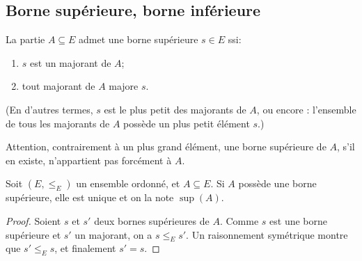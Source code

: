 \subsection{Borne supérieure, borne inférieure}

\begin{definition}
 La partie $A\subseteq E$ admet une borne supérieure $s\in E$ ssi:
\begin{enumerate}
\item $s$ est un majorant de $A$;
\item tout majorant de $A$ majore $s$.
\end{enumerate}
(En d'autres termes, $s$ est le plus petit des majorants de $A$, ou encore : l'ensemble de tous les majorants de $A$ possède un plus petit élément $s$.)
\end{definition}

Attention, contrairement à un plus grand élément, une  borne supérieure de $A$, s'il en existe, n'appartient pas forcément à $A$. 

\begin{proposition}
Soit $(E,\leq_E)$ un ensemble ordonné, et $A\subseteq E$. Si $A$ possède une borne supérieure, elle est unique et on la note $\sup(A)$.
\end{proposition}
\begin{proof}
Soient $s$ et $s'$ deux bornes supérieures de $A$. Comme $s$ est une borne supérieure et $s'$ un majorant, on a $s\leq_E s'$. Un raisonnement symétrique montre que  $s'\leq_E s$, et finalement $s'=s$.
\end{proof}

